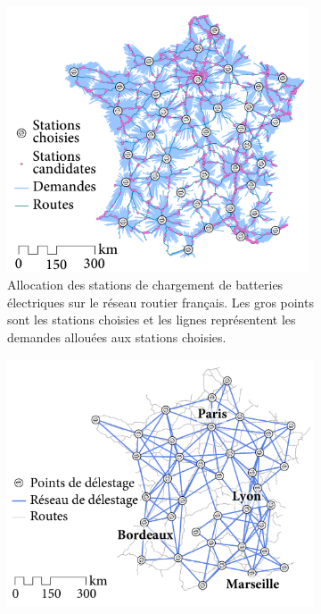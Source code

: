  
\begin{figure}[ht] 
    \centering 
    \begin{subfigure}[t]{0.47\columnwidth} 
            \centering 
            \includegraphics[width=0.98\textwidth]{figures-fr/France-allocation-charging-stations-fr.pdf} 
            \caption{Allocation des stations de chargement de batteries électriques sur le réseau routier français. Les gros points sont les stations choisies et les lignes représentent les demandes allouées aux stations choisies.} 
            \label{fig:France-location-allocation-fr} 
    \end{subfigure}%
    \quad %
    \begin{subfigure}[t]{0.5\columnwidth} 
            \centering 
            \includegraphics[width=\textwidth]{figures-fr/France-overlay-wo-capacity-fr.pdf} 

\end{subfigure}
\end{figure}
